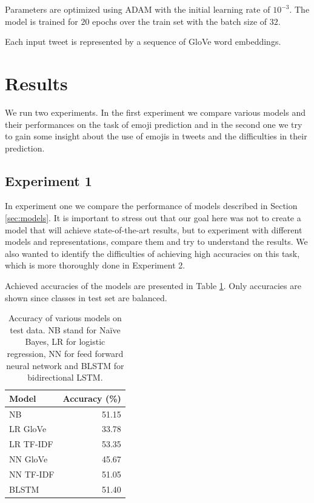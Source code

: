 \documentclass[10pt, a4paper]{article}
\begin{document}
Parameters are optimized using ADAM \citep{kingma2014adam} with the initial 
learning rate of $10^{-3}$. The model is trained for $20$ epochs over the train 
set with the batch size of $32$.

Each input tweet is represented by a sequence of GloVe word embeddings.

\section{Results}

We run two experiments. In the first experiment we compare various models and 
their performances on the task of emoji prediction and in the second one we try 
to gain some insight about the use of emojis in tweets and the difficulties in 
their prediction.

\subsection{Experiment 1}

In experiment one we compare the performance of models described in Section 
\ref{sec:models}. It is important to stress out that our goal here was not to 
create a model that will achieve state-of-the-art results, but to experiment 
with different models and representations, compare them and try to understand 
the results. We also wanted to identify the difficulties of achieving high 
accuracies on this task, which is more thoroughly done in Experiment 2.

Achieved accuracies of the models are presented in Table 
\ref{tab:accuracy}. Only accuracies are shown since classes in test set are 
balanced.

\begin{table}
\caption{Accuracy of various models on test data. NB stand for Na\"ive Bayes, LR
for logistic regression, NN for feed forward neural network and BLSTM for 
bidirectional LSTM.}
\label{tab:accuracy}
\begin{center}
\begin{tabular}{lr}
\toprule
Model & Accuracy (\%) \\
\midrule
NB        & 51.15 \\
LR GloVe  & 33.78 \\
LR TF-IDF & 53.35 \\
NN GloVe  & 45.67 \\
NN TF-IDF & 51.05 \\
BLSTM     & 51.40 \\
\bottomrule
\end{tabular}
\end{center}
\end{table}
\end{document}
